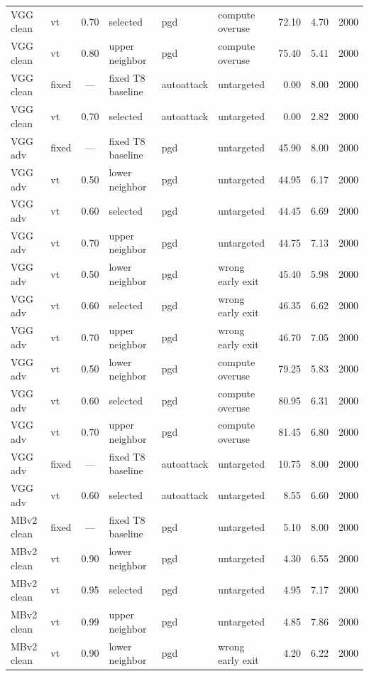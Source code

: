 {\begin{longtable}{@{}l l c l l l r r r@{}}
VGG clean & vt & 0.70 & selected & pgd & compute overuse & 72.10 & 4.70 & 2000 \\
VGG clean & vt & 0.80 & upper neighbor & pgd & compute overuse & 75.40 & 5.41 & 2000 \\
VGG clean & fixed & --- & fixed T8 baseline & autoattack & untargeted & 0.00 & 8.00 & 2000 \\
VGG clean & vt & 0.70 & selected & autoattack & untargeted & 0.00 & 2.82 & 2000 \\
\addlinespace
VGG adv & fixed & --- & fixed T8 baseline & pgd & untargeted & 45.90 & 8.00 & 2000 \\
VGG adv & vt & 0.50 & lower neighbor & pgd & untargeted & 44.95 & 6.17 & 2000 \\
VGG adv & vt & 0.60 & selected & pgd & untargeted & 44.45 & 6.69 & 2000 \\
VGG adv & vt & 0.70 & upper neighbor & pgd & untargeted & 44.75 & 7.13 & 2000 \\
VGG adv & vt & 0.50 & lower neighbor & pgd & wrong early exit & 45.40 & 5.98 & 2000 \\
VGG adv & vt & 0.60 & selected & pgd & wrong early exit & 46.35 & 6.62 & 2000 \\
VGG adv & vt & 0.70 & upper neighbor & pgd & wrong early exit & 46.70 & 7.05 & 2000 \\
VGG adv & vt & 0.50 & lower neighbor & pgd & compute overuse & 79.25 & 5.83 & 2000 \\
VGG adv & vt & 0.60 & selected & pgd & compute overuse & 80.95 & 6.31 & 2000 \\
VGG adv & vt & 0.70 & upper neighbor & pgd & compute overuse & 81.45 & 6.80 & 2000 \\
VGG adv & fixed & --- & fixed T8 baseline & autoattack & untargeted & 10.75 & 8.00 & 2000 \\
VGG adv & vt & 0.60 & selected & autoattack & untargeted & 8.55 & 6.60 & 2000 \\
\addlinespace
MBv2 clean & fixed & --- & fixed T8 baseline & pgd & untargeted & 5.10 & 8.00 & 2000 \\
MBv2 clean & vt & 0.90 & lower neighbor & pgd & untargeted & 4.30 & 6.55 & 2000 \\
MBv2 clean & vt & 0.95 & selected & pgd & untargeted & 4.95 & 7.17 & 2000 \\
MBv2 clean & vt & 0.99 & upper neighbor & pgd & untargeted & 4.85 & 7.86 & 2000 \\
MBv2 clean & vt & 0.90 & lower neighbor & pgd & wrong early exit & 4.20 & 6.22 & 2000 \\

\end{longtable}}
